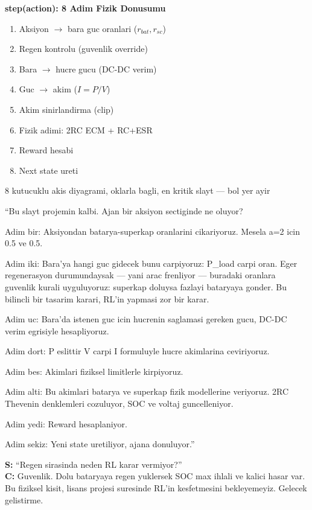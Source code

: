 \documentclass[11pt,a4paper]{article}
\begin{document}
\begin{slytboks}
\textbf{step(action): 8 Adim Fizik Donusumu}
\begin{enumerate}
\item Aksiyon $\to$ bara guc oranlari ($r_{bat}, r_{sc}$)
\item Regen kontrolu (guvenlik override)
\item Bara $\to$ hucre gucu (DC-DC verim)
\item Guc $\to$ akim ($I = P/V$)
\item Akim sinirlandirma (clip)
\item Fizik adimi: 2RC ECM + RC+ESR
\item Reward hesabi
\item Next state ureti
\end{enumerate}
\end{slytboks}

\begin{gorselboks}
8 kutucuklu akis diyagrami, oklarla bagli, en kritik slayt --- bol yer ayir
\end{gorselboks}

\begin{sayboks}
``Bu slayt projemin kalbi. Ajan bir aksiyon sectiginde ne oluyor?

Adim bir: Aksiyondan batarya-superkap oranlarini cikariyoruz. Mesela a=2 icin 0.5 ve 0.5.

Adim iki: Bara'ya hangi guc gidecek bunu carpiyoruz: P\_load carpi oran. Eger regenerasyon durumundaysak --- yani arac frenliyor --- buradaki oranlara guvenlik kurali uyguluyoruz: superkap doluysa fazlayi bataryaya gonder. Bu bilincli bir tasarim karari, RL'in yapmasi zor bir karar.

Adim uc: Bara'da istenen guc icin hucrenin saglamasi gereken gucu, DC-DC verim egrisiyle hesapliyoruz.

Adim dort: P eslittir V carpi I formuluyle hucre akimlarina ceviriyoruz.

Adim bes: Akimlari fiziksel limitlerle kirpiyoruz.

Adim alti: Bu akimlari batarya ve superkap fizik modellerine veriyoruz. 2RC Thevenin denklemleri cozuluyor, SOC ve voltaj guncelleniyor.

Adim yedi: Reward hesaplaniyor.

Adim sekiz: Yeni state uretiliyor, ajana donuluyor.''
\end{sayboks}

\begin{soruboks}
\textbf{S:} ``Regen sirasinda neden RL karar vermiyor?''\\
\textbf{C:} Guvenlik. Dolu bataryaya regen yuklersek SOC max ihlali ve kalici hasar var. Bu fiziksel kisit, lisans projesi suresinde RL'in kesfetmesini bekleyemeyiz. Gelecek gelistirme.
\end{soruboks}
\end{document}
